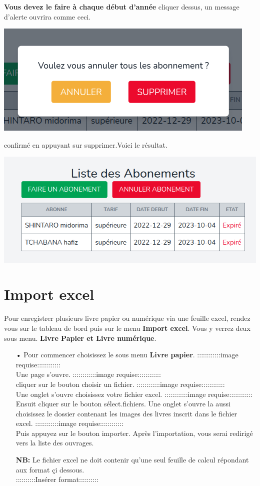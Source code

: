 \documentclass[12pt,a4paper]{article}
\begin{document}
\begin{itemize}
\textbf{Vous devez le faire à chaque début d'année} cliquer dessus, un message d'alerte
ouvrira comme ceci.
\begin{center}
\includegraphics[scale=0.56]{img/abonnement_cancel.png}
\end{center}
confirmé en appuyant sur supprimer.Voici le résultat.
\begin{center}
\includegraphics[scale=0.56]{img/abonnements2.png}
\end{center}
\end{itemize}


\section{Import excel}
Pour enregistrer plusieurs livre papier ou numérique via une feuille excel, rendez vous sur le
tableau de bord puis sur le menu \textbf{Import excel}. Vous y verrez deux sous menu.
\textbf{Livre Papier et Livre numérique}.
\begin{itemize}
\item[•] Pour commencer choisissez le sous menu \textbf{Livre papier}. 
::::::::::::image requise::::::::::::\\
Une page s'ouvre. 
::::::::::::image requise::::::::::::\\
cliquer sur le bouton choisir un fichier.
::::::::::::image requise::::::::::::\\
Une onglet s'ouvre choisissez votre fichier excel.
::::::::::::image requise::::::::::::\\
Ensuit cliquer sur le bouton sélect.fichiers.
Une onglet s'ouvre la aussi choisissez le dossier contenant les images des livres inscrit dans le fichier
excel.
::::::::::::image requise::::::::::::\\
Puis appuyez sur le bouton importer. Après l'importation, vous serai redirigé vers la liste des ouvrages.

\textbf{NB:} Le fichier excel ne doit contenir qu'une seul feuille de calcul répondant
aux format çi dessous.\\
::::::::::Insérer format::::::::::
\end{itemize} 
\end{document}
